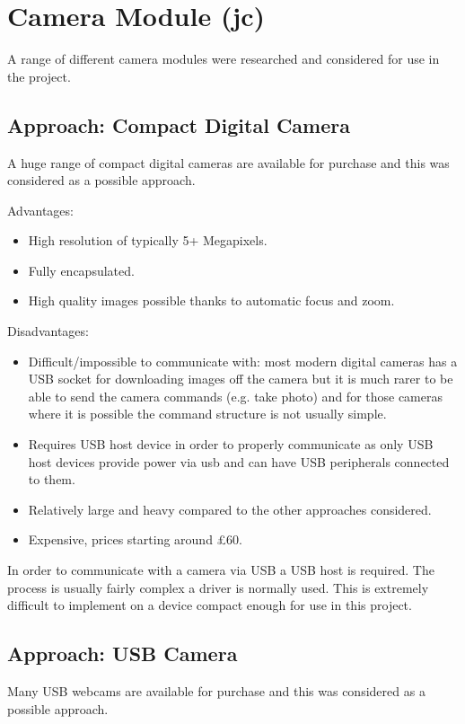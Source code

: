 \section{Camera Module (jc)}
\label{sec:John_options}

A range of different camera modules were researched and considered for use in the project.

\subsection{Approach: Compact Digital Camera}
\label{sec:Compact_option}
A huge range of compact digital cameras are available for purchase and this was considered as a possible approach.

Advantages:
      \begin{itemize}
         \item High resolution of typically 5+ Megapixels.
		 \item Fully encapsulated.
		 \item High quality images possible thanks to automatic focus and zoom.
     \end{itemize}

Disadvantages:
     \begin{itemize}
        \item Difficult/impossible to communicate with: most modern digital cameras has a USB socket for downloading images off the camera but it is much rarer to be able to send the camera commands (e.g. take photo) and for those cameras where it is possible the command structure is not usually simple.
        \item Requires USB host device in order to properly communicate as only USB host devices provide power via usb and can have USB peripherals connected to them.
	\item Relatively large and heavy compared to the other approaches considered.
	\item Expensive, prices starting around \pounds 60.
     \end{itemize}

In order to communicate with a camera via USB a USB host is required. The process is usually fairly complex a driver is normally used. This is extremely difficult to implement on a device compact enough for use in this project.

\subsection{Approach: USB Camera}
\label{sec:USB_option}
Many USB webcams are available for purchase and this was considered as a possible approach.

